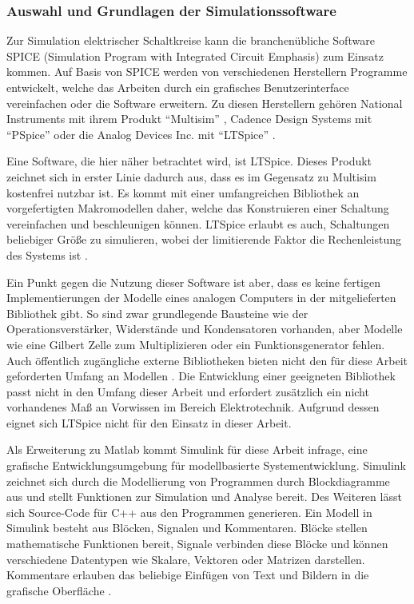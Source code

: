 \subsubsection{Auswahl und Grundlagen der Simulationssoftware}

Zur Simulation elektrischer Schaltkreise kann die branchenübliche Software SPICE (Simulation Program with Integrated Circuit Emphasis) zum Einsatz kommen. Auf Basis von SPICE werden von verschiedenen Herstellern Programme entwickelt, welche das Arbeiten durch \zbol ein grafisches Benutzerinterface vereinfachen oder die Software erweitern. Zu diesen Herstellern gehören \ua National Instruments mit ihrem Produkt "`Multisim"' \cite{NIMultisim}, Cadence Design Systems mit "`PSpice"' \cite{CadencePSpice} oder die Analog Devices Inc. mit "`LTSpice"' \cite{AnalogDevicesLTSpice}.

Eine Software, die hier näher betrachtet wird, ist LTSpice. Dieses Produkt zeichnet sich in erster Linie dadurch aus, dass es im Gegensatz zu \zbol Multisim kostenfrei nutzbar ist. Es kommt mit einer umfangreichen Bibliothek an vorgefertigten Makromodellen daher, welche das Konstruieren einer Schaltung vereinfachen und beschleunigen können. LTSpice erlaubt es auch, Schaltungen beliebiger Größe zu simulieren, wobei der limitierende Faktor die Rechenleistung des Systems ist \cite{Alonso2019}.

Ein Punkt gegen die Nutzung dieser Software ist aber, dass es keine fertigen Implementierungen der Modelle eines analogen Computers in der mitgelieferten Bibliothek gibt. So sind zwar grundlegende Bausteine wie der Operationsverstärker, Widerstände und Kondensatoren vorhanden, aber Modelle wie eine Gilbert Zelle zum Multiplizieren oder ein Funktionsgenerator fehlen. Auch öffentlich zugängliche externe Bibliotheken bieten nicht den für diese Arbeit geforderten Umfang an Modellen \cite[vgl.]{MaffeiLTSpiceAnalogComputer}. Die Entwicklung einer geeigneten Bibliothek passt nicht in den Umfang dieser Arbeit und erfordert zusätzlich ein nicht vorhandenes Maß an Vorwissen im Bereich Elektrotechnik. Aufgrund dessen eignet sich LTSpice nicht für den Einsatz in dieser Arbeit.

Als Erweiterung zu Matlab kommt Simulink für diese Arbeit infrage, eine grafische Entwicklungsumgebung für modellbasierte Systementwicklung. Simulink zeichnet sich durch die Modellierung von Programmen durch Blockdiagramme aus und stellt Funktionen zur Simulation und Analyse bereit. Des Weiteren lässt sich Source-Code für \zb C++ aus den Programmen generieren. Ein Modell in Simulink besteht aus Blöcken, Signalen und Kommentaren. Blöcke stellen mathematische Funktionen bereit, Signale verbinden diese Blöcke und können verschiedene Datentypen wie Skalare, Vektoren oder Matrizen darstellen. Kommentare erlauben das beliebige Einfügen von Text und Bildern in die grafische Oberfläche \cite{Peasley2018}.

